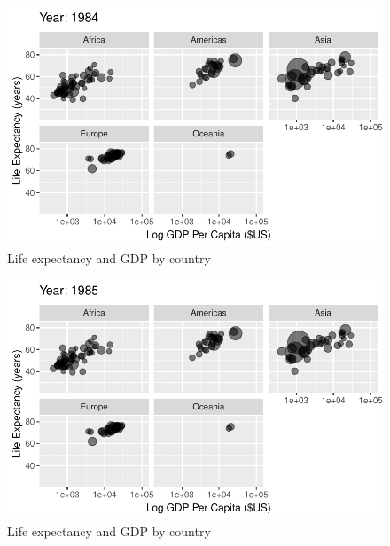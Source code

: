 \documentclass[
  letterpaper,
  DIV=11,
  numbers=noendperiod]{scrreport}
\theoremstyle{definition}
\theoremstyle{remark}
\begin{document}
\begin{figure}

{\centering \includegraphics{index_files/figure-pdf/fig-anim-lifegdp-59.pdf}

}

\caption{\label{fig-anim-lifegdp-59}Life expectancy and GDP by country}

\end{figure}

\begin{figure}

{\centering \includegraphics{index_files/figure-pdf/fig-anim-lifegdp-60.pdf}

}

\caption{\label{fig-anim-lifegdp-60}Life expectancy and GDP by country}

\end{figure}
\end{document}

